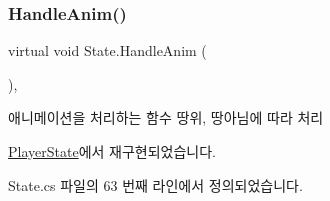 \subsubsection{\texorpdfstring{HandleAnim()}{HandleAnim()}}
{\footnotesize\ttfamily virtual void State.\+Handle\+Anim (\begin{DoxyParamCaption}{ }\end{DoxyParamCaption})\hspace{0.3cm}{\ttfamily [inline]}, {\ttfamily [virtual]}}



애니메이션을 처리하는 함수\textquotesingle{} 땅위, 땅아님에 따라 처리 



\mbox{\hyperlink{class_player_state_ae57c0c11c946d701bb1e0eb2bc7204dd}{Player\+State}}에서 재구현되었습니다.



State.\+cs 파일의 63 번째 라인에서 정의되었습니다.


